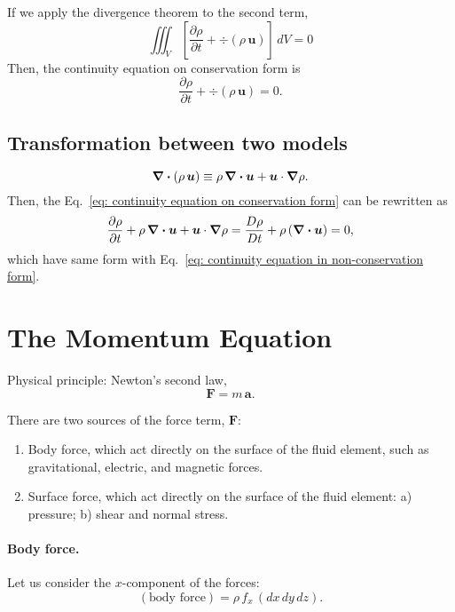 If we apply the divergence theorem to the second term, 
\begin{equation*}
    \iiint_V \left[
        \frac{\partial \rho}{\partial t}
        + \div (\rho\,\bm{u})
        \right]\,dV = 0
\end{equation*}
Then, the continuity equation on conservation form is 
\begin{equation}
    \frac{\partial \rho}{\partial t}
    + \div (\rho\,\bm{u})
    = 0. 
    \label{eq: continuity equation on conservation form}
\end{equation}

\subsection{Transformation between two models}
\begin{equation}
    \div (\rho \, \bm{u}) 
    \equiv 
    \rho \, \div \bm{u}
    + \bm{u} \cdot \grad \rho . 
\end{equation}
Then, the Eq.~\eqref{eq: continuity equation on conservation form} can be rewritten as 
\begin{equation}
    \frac{\partial \rho}{\partial t} 
    + \rho \, \div \bm{u}
    + \bm{u} \cdot \grad \rho
    = \frac{D\rho}{Dt}
    + \rho \,(\div \bm{u})
    = 0, 
\end{equation}
which have same form with Eq.~\eqref{eq: continuity equation in non-conservation form}. 

\section{The Momentum Equation}
Physical principle: Newton's second law, 
\begin{equation}
    \bm{F} = m\, \bm{a}.
    \label{eq: newton's second law}
\end{equation}

There are two sources of the force term, $\bm{F}$: 
\begin{enumerate}
    \item Body force, which act directly on the surface of the fluid element, such as gravitational, electric, and magnetic forces. 
    \item Surface force, which act directly on the surface of the fluid element: a) pressure; b) shear and normal stress.
\end{enumerate}

\paragraph{Body force. }
Let us consider the $x$-component of the forces: 
\begin{equation}
    (\text{body force}) = \rho \, f_x\, (dx\, dy\, dz).
\end{equation}

